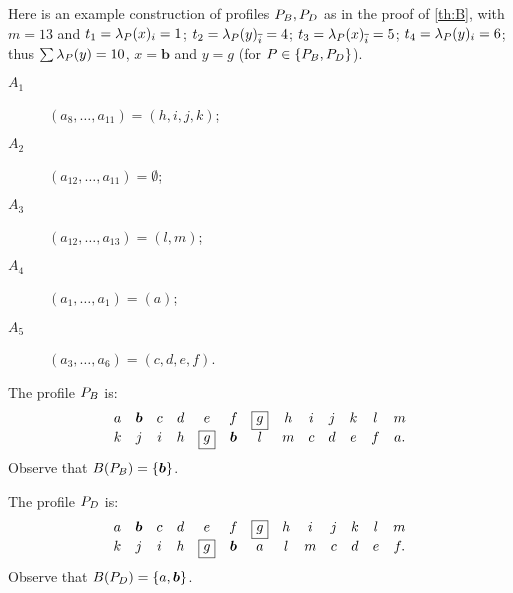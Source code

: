 \documentclass[pagesize, twoside=off, bibliography=totoc, DIV=calc, fontsize=12pt, a4paper]{scrartcl}
\begin{document}
\begin{example}
	\label{ex:profs}
Here is an example construction of profiles $P_B, P_D$ as in the proof of \cref{th:B}, with $m = 13$ and $t_1 = \lambda_P(x)_i = 1$; $t_2 = \lambda_P(y)_{\overline{i}} = 4$; $t_3 = \lambda_P(x)_{\overline{i}} = 5$; $t_4 = \lambda_P(y)_i = 6$; thus $\sum \lambda_P(y) = 10$, $x = \bm{b}$ and $y = \boxed{g}$ (for $P \in \{P_B, P_D\}$).
	\begin{description}
		\item[$A_1$] $(a_8, …, a_{11}) = (h, i, j, k)$;
		\item[$A_2$] $(a_{12}, …, a_{11}) = \emptyset$;
		\item[$A_3$] $(a_{12}, …, a_{13}) = (l, m)$;
		\item[$A_4$] $(a_1, …, a_1) = (a)$;
		\item[$A_5$] $(a_3, …, a_6) = (c, d, e, f)$.
	\end{description}

	The profile $P_B$ is:
  \begin{equation}
    \begin{array}{*{13}c}
      a&\bm{b}&c&d&e&f&\boxed{g}&h&i&j&k&l&m\\
      k&j&i&h&\boxed{g}&\bm{b}&l&m&c&d&e&f&a.
    \end{array}
  \end{equation}
	Observe that $B(P_B) = \{\bm{b}\}$.

	The profile $P_D$ is:
  \begin{equation}
    \begin{array}{*{13}c}
      a&\bm{b}&c&d&e&f&\boxed{g}&h&i&j&k&l&m\\
      k&j&i&h&\boxed{g}&\bm{b}&a&l&m&c&d&e&f.
    \end{array}
  \end{equation}
	Observe that $B(P_D) = \{a, \bm{b}\}$.
\end{example}
\end{document}
